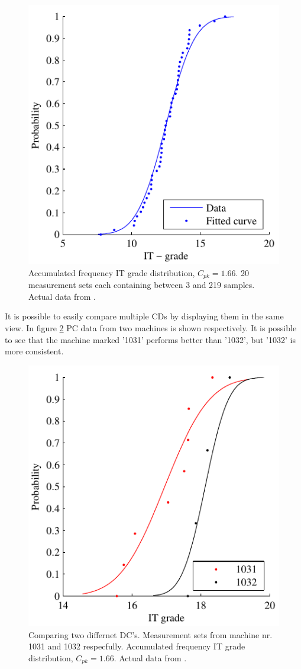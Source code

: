 \documentclass[aip,amsmath, preprint, author-year]{revtex4-1}
\begin{document}
\begin{figure}
\includegraphics{Acum_freqIT.pdf}
\caption{\label{fig:acumfreq} Accumulated frequency IT grade distribution, $C_{pk} =1.66$. 
20 measurement sets each containing between 3 and 219 samples. 
Actual data from \cite{thornton2000use}. }
\end{figure}

It is possible to easily compare multiple CDs by displaying them in the same view. In figure \ref{fig:acumfreqF3} PC data from two machines is shown respectively. 
It is possible to see that the machine marked '1031' performs better than '1032', but '1032' is more consistent.

\begin{figure}
\includegraphics{Acum_freqF3.pdf}
\caption{\label{fig:acumfreqF3} Comparing two differnet DC's. 
Measurement sets from machine nr. 1031 and 1032 respecfully. 
Accumulated frequency IT grade distribution, $C_{pk} =1.66$. 
Actual data from \cite{thornton2000use}. }
\end{figure}
\end{document}
